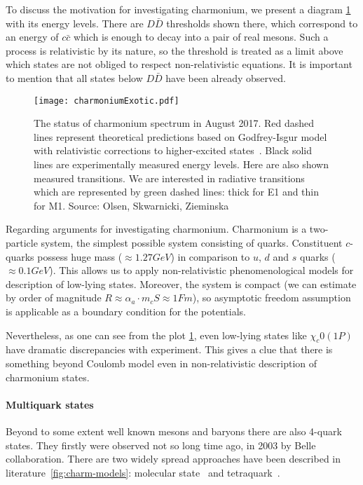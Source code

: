 To discuss the motivation for investigating charmonium, we present a diagram \cref{fig:charm-states} with its energy levels. There are $D\bar{D}$ thresholds shown there, which correspond to an energy of $c \bar{c}$ which is enough to decay into a pair of real mesons. Such a process is relativistic by its nature, so the threshold is treated as a limit above which states are not obliged to respect non-relativistic equations. It is important to mention that all states below $D\bar{D}$ have been already observed.

\begin{figure}[H]
    \centering
    \texttt{[image: charmoniumExotic.pdf]}
    \caption{The status of charmonium spectrum in August 2017. Red dashed lines represent theoretical predictions based on Godfrey-Isgur model with relativistic corrections to higher-excited states~\cite{gbs-model}. Black solid lines are experimentally measured energy levels. Here are also shown measured transitions. We are interested in radiative transitions which are represented by green dashed lines: thick for E1 and thin for M1. Source: Olsen, Skwarnicki, Zieminska~\cite{heavy-quark_pics}} \label{fig:charm-states}
\end{figure}

Regarding arguments for investigating charmonium. Charmonium is a two-particle system, the simplest possible system consisting of quarks. Constituent $c$-quarks possess huge mass ($\approx 1.27 GeV$) in comparison to $u$, $d$ and $s$ quarks ($\approx 0.1 GeV$). This allows us to apply non-relativistic phenomenological models for description of low-lying states. Moreover, the system is compact (we can estimate by order of magnitude $R \approx \alpha_a \cdot m_cS \approx 1 Fm$), so asymptotic freedom assumption is applicable as a boundary condition for the potentials.\cite{charm-slides}

Nevertheless, as one can see from the plot \cref{fig:charm-states}, even low-lying states like $\chi_c0(1P)$ have dramatic discrepancies with experiment. This gives a clue that there is something beyond Coulomb model even in non-relativistic description of charmonium states.

\paragraph{Multiquark states}
Beyond to some extent well known mesons and baryons there are also 4-quark states. They firstly were observed not so long time ago, in 2003 by Belle collaboration. There are two widely spread approaches have been described in literature~\cref{fig:charm-models}: molecular state~\cite{molecular-model} and tetraquark~\cite{tetraquark-model}.

